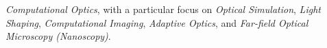 \textit{Computational Optics}, with a particular focus on \textit{Optical Simulation}, \textit{Light Shaping}, \textit{Computational Imaging}, \textit{Adaptive Optics}, and \textit{Far-field Optical Microscopy (Nanoscopy)}.